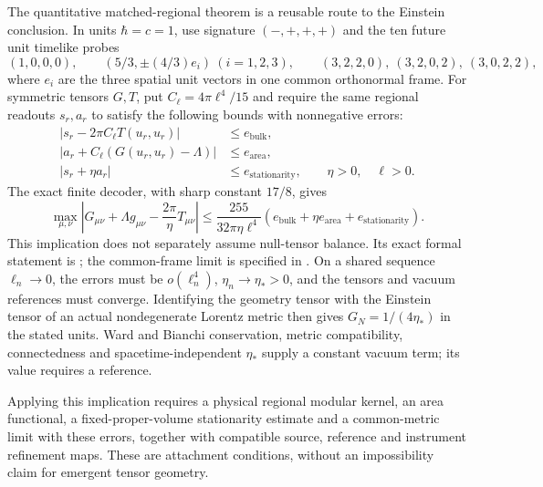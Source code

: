 \documentclass[11pt]{article}
\begin{document}
The quantitative matched-regional theorem is a reusable route to the
Einstein conclusion. In units $\hbar=c=1$, use signature $(-,+,+,+)$
and the ten future unit timelike probes
\[
 (1,0,0,0),\qquad (5/3,\pm(4/3)e_i)\ (i=1,2,3),\qquad
 (3,2,2,0),\ (3,2,0,2),\ (3,0,2,2),
\]
where $e_i$ are the three spatial unit vectors in one common orthonormal
frame. For symmetric tensors $G,T$, put $C_\ell=4\pi\ell^4/15$ and require
the same regional readouts $s_r,a_r$ to satisfy the following bounds with
nonnegative errors:
\begin{align*}
 |s_r-2\pi C_\ell T(u_r,u_r)|&\leq e_{\mathrm{bulk}},\\
 |a_r+C_\ell(G(u_r,u_r)-\Lambda)|&\leq e_{\mathrm{area}},\\
 |s_r+\eta a_r|&\leq e_{\mathrm{stationarity}},\qquad \eta>0,\quad\ell>0.
\end{align*}
The exact finite decoder, with sharp constant $17/8$, gives
\[
 \max_{\mu,\nu}\left|G_{\mu\nu}+\Lambda g_{\mu\nu}
              -\frac{2\pi}{\eta}T_{\mu\nu}\right|
 \leq\frac{255}{32\pi\eta\ell^4}
       (e_{\mathrm{bulk}}+\eta e_{\mathrm{area}}+e_{\mathrm{stationarity}}).
\]
This implication does not separately assume null-tensor balance.
Its exact formal statement is
;
the common-frame limit is specified in .
On a shared sequence $\ell_n\to0$, the errors must be $o(\ell_n^4)$,
$\eta_n\to\eta_*>0$, and the tensors and vacuum references must converge.
Identifying the geometry tensor with the Einstein tensor of an actual
nondegenerate Lorentz metric then gives $G_N=1/(4\eta_*)$ in the stated
units. Ward and Bianchi conservation, metric compatibility, connectedness
and spacetime-independent $\eta_*$ supply a constant vacuum term; its value
requires a reference.

Applying this implication requires a physical regional modular kernel, an
area functional, a fixed-proper-volume stationarity estimate and a
common-metric limit with these errors, together with compatible source,
reference and instrument refinement maps. These are attachment conditions,
without an impossibility claim for emergent tensor geometry.
\end{document}
